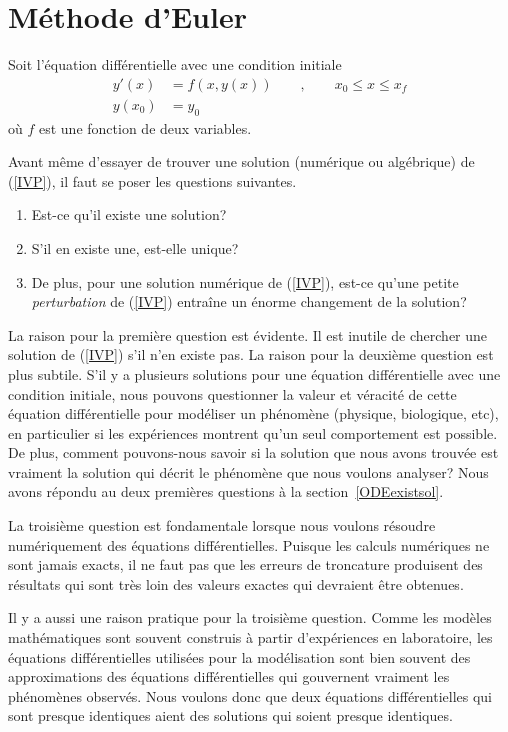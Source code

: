 {\section{Méthode d'Euler \eng}

Soit l'équation différentielle avec une condition initiale
\begin{equation} \label{IVP}
\begin{split}
y'(x) &= f(x,y(x)) \qquad , \qquad x_0 \leq x \leq x_f \\
y(x_0) &= y_0
\end{split}
\end{equation}
où $f$ est une fonction de deux variables.

Avant même d'essayer de trouver une solution (numérique ou algébrique)
de (\ref{IVP}), il faut se poser les questions suivantes.

\begin{enumerate}
\item Est-ce qu'il existe une solution?
\item S'il en existe une, est-elle unique?
\item De plus, pour une solution numérique de (\ref{IVP}), est-ce
  qu'une petite {\em perturbation} de (\ref{IVP}) entraîne un énorme
  changement de la solution?
\end{enumerate}

La raison pour la première question est évidente.  Il est inutile de
chercher une solution de (\ref{IVP}) s'il n'en existe pas.  La raison
pour la deuxième question est plus subtile.  S'il y a plusieurs
solutions pour une équation différentielle avec une condition
initiale, nous pouvons questionner la valeur et véracité de cette équation
différentielle pour modéliser un phénomène (physique, biologique, etc), en
particulier si les expériences montrent qu'un seul comportement est
possible.  De plus, comment pouvons-nous savoir si la solution que
nous avons trouvée est vraiment la solution qui décrit le phénomène que nous
voulons analyser?    Nous avons répondu au deux premières questions à
la section~\ref{ODEexistsol}.

La troisième question est fondamentale lorsque nous voulons résoudre
numériquement des équations différentielles.  Puisque les calculs
numériques ne sont jamais exacts, il ne faut pas que les erreurs de
troncature produisent des résultats qui sont très loin des valeurs
exactes qui devraient être obtenues.

Il y a aussi une raison pratique pour la troisième question.  Comme
les modèles mathématiques sont souvent construis à partir
d'expériences en laboratoire, les équations différentielles utilisées
pour la modélisation sont bien souvent des approximations des
équations différentielles qui gouvernent vraiment les phénomènes
observés.  Nous voulons donc que deux équations différentielles qui sont
presque identiques aient des solutions qui soient presque identiques.

}
